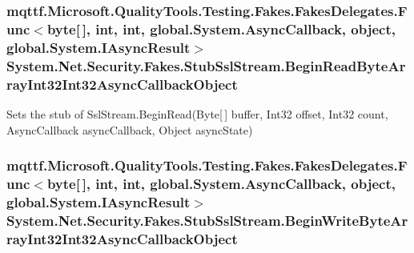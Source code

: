 \hypertarget{class_system_1_1_net_1_1_security_1_1_fakes_1_1_stub_ssl_stream_ac2bea323961ae49eec1d1694fb07f8ea}{
\subsubsection[{Begin\-Read\-Byte\-Array\-Int32\-Int32\-Async\-Callback\-Object}]{\setlength{\rightskip}{0pt plus 5cm}mqttf.\-Microsoft.\-Quality\-Tools.\-Testing.\-Fakes.\-Fakes\-Delegates.\-Func$<$byte\mbox{[}$\,$\mbox{]}, int, int, global.\-System.\-Async\-Callback, object, global.\-System.\-I\-Async\-Result$>$ System.\-Net.\-Security.\-Fakes.\-Stub\-Ssl\-Stream.\-Begin\-Read\-Byte\-Array\-Int32\-Int32\-Async\-Callback\-Object}}\label{class_system_1_1_net_1_1_security_1_1_fakes_1_1_stub_ssl_stream_ac2bea323961ae49eec1d1694fb07f8ea}


Sets the stub of Ssl\-Stream.\-Begin\-Read(\-Byte\mbox{[}$\,$\mbox{]} buffer, Int32 offset, Int32 count, Async\-Callback async\-Callback, Object async\-State)

\hypertarget{class_system_1_1_net_1_1_security_1_1_fakes_1_1_stub_ssl_stream_ad98f51f4f54114d8526f7d687dac0658}{
\subsubsection[{Begin\-Write\-Byte\-Array\-Int32\-Int32\-Async\-Callback\-Object}]{\setlength{\rightskip}{0pt plus 5cm}mqttf.\-Microsoft.\-Quality\-Tools.\-Testing.\-Fakes.\-Fakes\-Delegates.\-Func$<$byte\mbox{[}$\,$\mbox{]}, int, int, global.\-System.\-Async\-Callback, object, global.\-System.\-I\-Async\-Result$>$ System.\-Net.\-Security.\-Fakes.\-Stub\-Ssl\-Stream.\-Begin\-Write\-Byte\-Array\-Int32\-Int32\-Async\-Callback\-Object}}\label{class_system_1_1_net_1_1_security_1_1_fakes_1_1_stub_ssl_stream_ad98f51f4f54114d8526f7d687dac0658}


